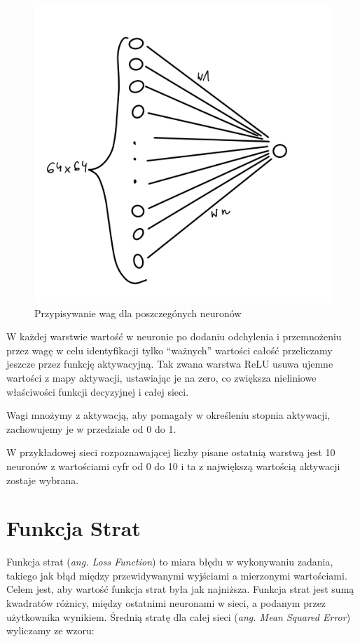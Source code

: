 \documentclass[brudnopis]{xmgr}
\begin{document}
\begin{figure}[!tbh]
\centering
\includegraphics[width=.8\hsize]{fig/3}
\caption{Przypisywanie wag dla poszczegónych neuronów\label{RYS.3}}
\end{figure}

W każdej warstwie  wartość w neuronie po dodaniu odchylenia i przemnożeniu przez wagę w celu identyfikacji tylko “ważnych” wartości całość przeliczamy jeszcze przez funkcję aktywacyjną. 
Tak zwana warstwa ReLU usuwa ujemne wartości z mapy aktywacji, ustawiając je na zero, co zwiększa nieliniowe właściwości funkcji decyzyjnej i całej sieci.


 Wagi mnożymy z aktywacją, aby pomagały w określeniu stopnia aktywacji, zachowujemy je w przedziale od 0 do 1.
 
 W przykładowej sieci rozpoznawającej liczby pisane ostatnią warstwą jest 10 neuronów z wartościami cyfr od 0 do 10 i ta z największą wartością aktywacji zostaje wybrana. 
 
 \section{Funkcja Strat \label{s:dsssl}}
 
Funkcja strat (\textit{ang. Loss Function}) to miara błędu w wykonywaniu zadania, takiego jak błąd między przewidywanymi wyjściami a mierzonymi wartościami. Celem jest, aby wartość funkcja strat była jak najniższa. 
Funkcja strat jest sumą kwadratów różnicy, między ostatnimi neuronami w sieci, a podanym przez użytkownika wynikiem. Średnią stratę dla całej sieci (\textit{ang. Mean Squared Error}) wyliczamy ze wzoru:  
\end{document}
